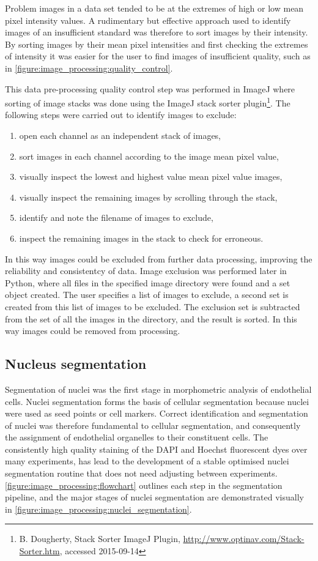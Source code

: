Problem images in a data set tended to be at the extremes of high or low mean pixel intensity values. A rudimentary but effective approach used to identify images of an insufficient standard was therefore to sort images by their intensity. By sorting images by their mean pixel intensities and first checking the extremes of intensity it was easier for the user to find images of insufficient quality, such as in \autoref{figure:image_processing:quality_control}.

This data pre-processing quality control step was performed in ImageJ where sorting of image stacks was done using the ImageJ stack sorter plugin\footnote{B. Dougherty, Stack Sorter ImageJ Plugin, \url{http://www.optinav.com/Stack-Sorter.htm}, accessed 2015-09-14}. The following steps were carried out to identify images to exclude:

\begin{enumerate}\setlength\itemsep{0pt}
	\item open each channel as an independent stack of images,
	\item sort images in each channel according to the image mean pixel value,
	\item visually inspect the lowest and highest value mean pixel value images,
	\item visually inspect the remaining images by scrolling through the stack,
	\item identify and note the filename of images to exclude,
	\item inspect the remaining images in the stack to check for erroneous.
\end{enumerate}
In this way images could be excluded from further data processing, improving the reliability and consistentcy of data. Image exclusion was performed later in Python, where all files in the specified image directory were found and a set object created. The user specifies a list of images to exclude, a second set is created from this list of images to be excluded. The exclusion set is subtracted from the set of all the images in the directory, and the result is sorted. In this way images could be removed from processing.

\subsection{Nucleus segmentation}
\label{endothelial_morphometry:image_processing:nuclei}
Segmentation of nuclei was the first stage in morphometric analysis of endothelial cells. Nuclei segmentation forms the basis of cellular segmentation because nuclei were used as seed points or cell markers. Correct identification and segmentation of nuclei was therefore fundamental to cellular segmentation, and consequently the assignment of endothelial organelles to their constituent cells. The consistently high quality staining of the DAPI and Hoechst fluorescent dyes over many experiments, has lead to the development of a stable optimised nuclei segmentation routine that does not need adjusting between experiments. \autoref{figure:image_processing:flowchart} outlines each step in the segmentation pipeline, and the major stages of nuclei segmentation are demonstrated visually in \autoref{figure:image_processing:nuclei_segmentation}.

